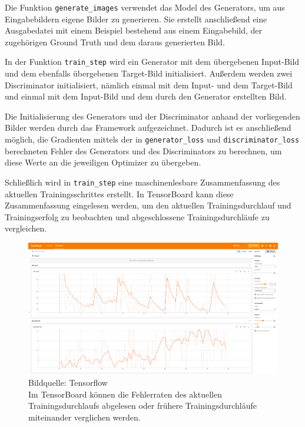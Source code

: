 Die Funktion \lstinline|generate_images| verwendet das Model des Generators, um aus Eingabebildern eigene Bilder zu generieren. Sie erstellt anschließend eine Ausgabedatei mit einem Beispiel bestehend aus einem Eingabebild, der zugehörigen Ground Truth und dem daraus generierten Bild.

In der Funktion \lstinline|train_step| wird ein Generator mit dem übergebenen Input-Bild und dem ebenfalls übergebenen Target-Bild initialisiert. Außerdem werden zwei Discriminator initialisiert, nämlich einmal mit dem Input- und dem Target-Bild und einmal mit dem Input-Bild und dem durch den Generator erstellten Bild.

Die Initialisierung des Generators und der Discriminator anhand der vorliegenden Bilder werden durch das Framework aufgezeichnet. Dadurch ist es anschließend möglich, die Gradienten mittels der in \lstinline|generator_loss| und \lstinline|discriminator_loss| berechneten Fehler des Generators und des Discriminators zu berechnen, um diese Werte an die jeweiligen Optimizer zu übergeben.

Schließlich wird in \lstinline|train_step| eine maschinenlesbare Zusammenfassung des aktuellen Trainingsschrittes erstellt. In TensorBoard kann diese Zusammenfassung eingelesen werden, um den aktuellen Trainingsdurchlauf und Trainingserfolg zu beobachten und abgeschlossene Trainingsdurchläufe zu vergleichen.

\begin{figure}[h]
	\centering
	\includegraphics[width=1.0\textwidth]{bilder/tensorboard.png}
	\caption[TensorBoard]{Bildquelle: Tensorflow \cite{tensorflow2015-whitepaper} \\ Im TensorBoard können die Fehlerraten des aktuellen Trainingsdurchlaufs abgelesen oder frühere Trainingsdurchläufe miteinander verglichen werden.}
	\label{fig:tensorboard}
\end{figure}


